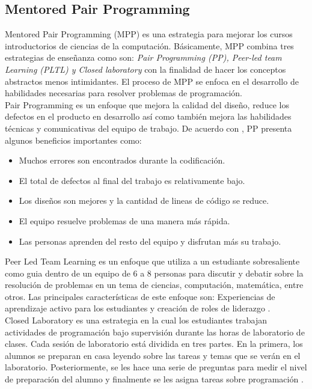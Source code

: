 \subsection{Mentored Pair Programming}
Mentored Pair Programming (MPP) es una estrategia para mejorar los cursos introductorios de ciencias de la computación. Básicamente, MPP combina tres estrategias de enseñanza como son: \emph{Pair Programming (PP), Peer-led team Learning (PLTL) y Closed laboratory} con la finalidad de hacer los conceptos abstractos menos intimidantes. El proceso de MPP se enfoca en el desarrollo de habilidades necesarias para resolver problemas de programación. \cite{han_enhancement_2010}\\

Pair Programming es un enfoque que mejora la calidad del diseño, reduce los defectos en el producto en desarrollo así como también mejora las habilidades técnicas y comunicativas del equipo de trabajo. De acuerdo con , PP presenta algunos beneficios importantes como:\\

\begin{itemize}
	\item Muchos errores son encontrados durante la codificación.
	\item El total de defectos al final del trabajo es relativamente bajo.
	\item Los diseños son mejores y la cantidad de lineas de código se reduce.
	\item El equipo resuelve problemas de una manera más rápida.
	\item Las personas aprenden del resto del equipo y disfrutan más su trabajo.
\end{itemize}

Peer Led Team Learning es un enfoque que utiliza a un estudiante sobresaliente como guia dentro de un equipo de 6 a 8 personas para discutir y debatir sobre la resolución de problemas en un tema de ciencias, computación, matemática, entre otros. Las principales características de este enfoque son: Experiencias de aprendizaje activo para los estudiantes y creación de roles de liderazgo \cite{han_enhancement_2010}.\\

Closed Laboratory es una estrategia en la cual los estudiantes trabajan actividades de programación bajo supervisión durante las horas de laboratorio de clases. Cada sesión de laboratorio está dividida en tres partes. En la primera, los alumnos se preparan en casa leyendo sobre las tareas y temas que se verán en el laboratorio. Posteriormente, se les hace una serie de preguntas para medir el nivel de preparación del alumno y finalmente se les asigna tareas sobre programación \cite{han_enhancement_2010}.  
